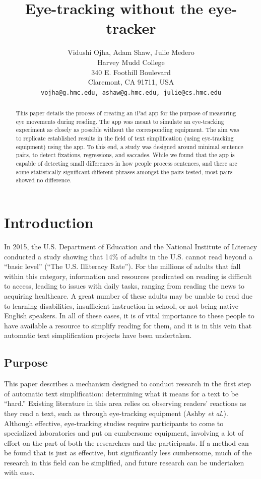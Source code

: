 \documentclass[11pt,letterpaper]{article}
\title{Eye-tracking without the eye-tracker\Thanks{Acknowledgements and thanks go here.}}
\author{Vidushi Ojha, Adam Shaw, Julie Medero\\
	Harvey Mudd College\\
	340 E. Foothill Boulevard\\
	Claremont, CA 91711, USA\\
	{\tt vojha@g.hmc.edu, ashaw@g.hmc.edu, julie@cs.hmc.edu}}
\date{}
\begin{document}
	\maketitle
	\begin{abstract}
		This paper details the process of creating an iPad app for the purpose of measuring eye movements during reading. The app was meant to simulate an eye-tracking experiment as closely as possible without the corresponding equipment. The aim was to replicate established results in the field of text simplification (using eye-tracking equipment) using the app. To this end, a study was designed around minimal sentence pairs, to detect fixations, regressions, and saccades. While we found that the app is capable of detecting small differences in how people process sentences, and there are some statistically significant different phrases amongst the pairs tested, most pairs showed no difference.
	\end{abstract}
	
	\section{Introduction}
	
	In 2015, the U.S. Department of Education and the National Institute of Literacy conducted a study showing that 14\% of adults in the U.S. cannot read beyond a ``basic level'' (``The U.S. Illiteracy Rate''). For the millions of adults that fall within this category, information and resources predicated on reading is difficult to access, leading to issues with daily tasks, ranging from reading the news to acquiring healthcare. A great number of these adults may be unable to read due to learning disabilities, insufficient instruction in school, or not being native English speakers. In all of these cases, it is of vital importance to these people to have available a resource to simplify reading for them, and it is in this vein that automatic text simplification projects have been undertaken.
	
	\subsection{Purpose}
	
	This paper describes a mechanism designed to conduct research in the first step of automatic text simplification: determining what it means for a text to be ``hard.'' Existing literature in this area relies on observing readers' reactions as they read a text, such as through eye-tracking equipment (Ashby \textit{et al.}). Although effective, eye-tracking studies require participants to come to specialized laboratories and put on cumbersome equipment, involving a lot of effort on the part of both the researchers and the participants. If a method can be found that is just as effective, but significantly less cumbersome, much of the research in this field can be simplified, and future research can be undertaken with ease.
	
\end{document}

